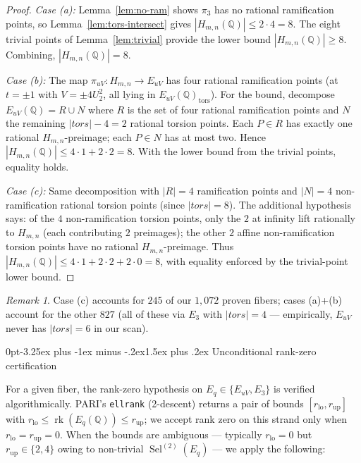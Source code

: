 \documentclass[12pt,a4paper,reqno]{amsart}
\makeatletter
\renewcommand{\subsection}{\@startsection{subsection}{2}%
  {0pt}{-3.25ex plus -1ex minus -.2ex}{1.5ex plus .2ex}%
  {\normalfont\normalsize\bfseries}}
\theoremstyle{plain}
\theoremstyle{definition}
\theoremstyle{remark}
\newtheorem{remark}[theorem]{Remark}
\newcommand{\Q}{\mathbb{Q}}
\newcommand{\HC}{H_{m,n}}
\newcommand{\rk}{\operatorname{rk}}
\newcommand{\tors}{\mathrm{tors}}
\DeclareMathOperator{\Sel}{Sel}
\makeatother
\begin{document}
\begin{proof}
\emph{Case (a):} Lemma~\ref{lem:no-ram} shows $\pi_3$ has no rational ramification points, so Lemma~\ref{lem:tors-intersect} gives $|\HC(\Q)| \le 2 \cdot 4 = 8$. The eight trivial points of Lemma~\ref{lem:trivial} provide the lower bound $|\HC(\Q)| \ge 8$. Combining, $|\HC(\Q)| = 8$.

\emph{Case (b):} The map $\pi_{uV}: \HC \to E_{uV}$ has four rational ramification points (at $t = \pm 1$ with $V = \pm 4 U_2^2$, all lying in $E_{uV}(\Q)_\tors$). For the bound, decompose $E_{uV}(\Q) = R \cup N$ where $R$ is the set of four rational ramification points and $N$ the remaining $|tors| - 4 = 2$ rational torsion points. Each $P \in R$ has exactly one rational $\HC$-preimage; each $P \in N$ has at most two. Hence $|\HC(\Q)| \le 4 \cdot 1 + 2 \cdot 2 = 8$. With the lower bound from the trivial points, equality holds.

\emph{Case (c):} Same decomposition with $|R| = 4$ ramification points and $|N| = 4$ non-ramification rational torsion points (since $|tors| = 8$). The additional hypothesis says: of the $4$ non-ramification torsion points, only the $2$ at infinity lift rationally to $\HC$ (each contributing $2$ preimages); the other $2$ affine non-ramification torsion points have no rational $\HC$-preimage. Thus $|\HC(\Q)| \le 4 \cdot 1 + 2 \cdot 2 + 2 \cdot 0 = 8$, with equality enforced by the trivial-point lower bound.
\end{proof}

\begin{remark}
Case (c) accounts for $245$ of our $1{,}072$ proven fibers; cases (a)+(b) account for the other $827$ (all of these via $E_3$ with $|tors| = 4$ — empirically, $E_{uV}$ never has $|tors| = 6$ in our scan).
\end{remark}

\subsection{Unconditional rank-zero certification}
\label{ssec:rank-cert}

For a given fiber, the rank-zero hypothesis on $E_q \in \{E_{uV}, E_3\}$ is verified algorithmically. PARI's \texttt{ellrank} (2-descent) returns a pair of bounds $[r_{\mathrm{lo}}, r_{\mathrm{up}}]$ with $r_{\mathrm{lo}} \le \rk(E_q(\Q)) \le r_{\mathrm{up}}$; we accept rank zero on this strand only when $r_{\mathrm{lo}} = r_{\mathrm{up}} = 0$. When the bounds are ambiguous --- typically $r_{\mathrm{lo}} = 0$ but $r_{\mathrm{up}} \in \{2, 4\}$ owing to non-trivial $\Sel^{(2)}(E_q)$ --- we apply the following:
\end{document}
